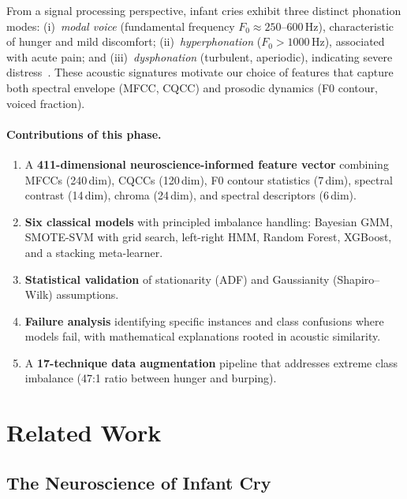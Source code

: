 \documentclass[11pt,a4paper]{article}
\begin{document}
From a signal processing perspective, infant cries exhibit three
distinct phonation modes: (i)~\textit{modal voice} (fundamental
frequency $F_0 \approx 250$--$600$\,Hz), characteristic of hunger and
mild discomfort; (ii)~\textit{hyperphonation} ($F_0 > 1000$\,Hz),
associated with acute pain; and (iii)~\textit{dysphonation} (turbulent,
aperiodic), indicating severe distress~\cite{lester1978acoustic}. These
acoustic signatures motivate our choice of features that capture both
spectral envelope (MFCC, CQCC) and prosodic dynamics (F0 contour,
voiced fraction).

\paragraph{Contributions of this phase.}
\begin{enumerate}[nosep]
  \item A \textbf{411-dimensional neuroscience-informed feature vector}
        combining MFCCs (240\,dim), CQCCs (120\,dim), F0 contour
        statistics (7\,dim), spectral contrast (14\,dim), chroma
        (24\,dim), and spectral descriptors (6\,dim).
  \item \textbf{Six classical models} with principled imbalance
        handling: Bayesian GMM, SMOTE-SVM with grid search, left-right
        HMM, Random Forest, XGBoost, and a stacking meta-learner.
  \item \textbf{Statistical validation} of stationarity (ADF) and
        Gaussianity (Shapiro--Wilk) assumptions.
  \item \textbf{Failure analysis} identifying specific instances and
        class confusions where models fail, with mathematical
        explanations rooted in acoustic similarity.
  \item A \textbf{17-technique data augmentation} pipeline that
        addresses extreme class imbalance (47:1 ratio between hunger and
        burping).
\end{enumerate}

\section{Related Work}
\label{sec:related}

\subsection{The Neuroscience of Infant Cry}
\end{document}
